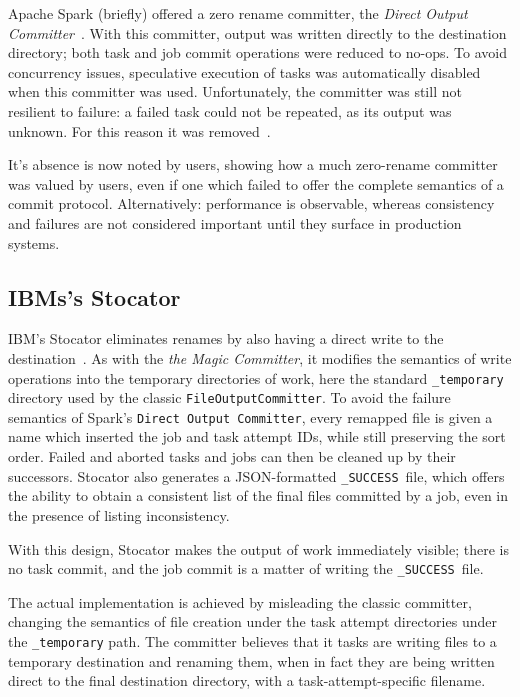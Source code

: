 \documentclass[conference]{IEEEtran}
\newcommand{\SUCCESS}{\texttt{\_SUCCESS}\ }
\begin{document}
Apache Spark (briefly) offered a zero rename committer,
the \emph{Direct Output Committer}\ \cite{SPARK-6352}.
With this committer, output was written directly to the destination directory;
both task and job commit operations were reduced to no-ops.
To avoid concurrency issues, speculative execution of tasks was automatically
disabled when this committer was used.
Unfortunately, the committer was still not resilient to failure: a failed
task could not be repeated, as its output was unknown.
For this reason it was removed\ \cite{SPARK-10063}.

It's absence is now noted by users, showing how a much zero-rename committer
was valued by users, even if one which failed to offer the complete semantics
of a commit protocol.
Alternatively: performance is observable, whereas consistency and failures
are not considered important until they surface in production systems.

\subsection{IBMs's Stocator}
\label{subsec:stocator}


IBM's Stocator eliminates renames by also having a direct write to the
destination\ \cite{Stocator}.
As with the \emph{the Magic Committer}, it modifies the semantics of write
operations into the temporary directories of work, here the standard
\texttt{\_temporary} directory used by the classic \texttt{FileOutputCommitter}.
To avoid the failure semantics of Spark's \texttt{Direct Output Committer},
every remapped file is given a name which inserted the job and task attempt IDs,
while still preserving the sort order.
Failed and aborted tasks and jobs can then be cleaned up by their successors.
Stocator also generates a JSON-formatted \SUCCESS file, which offers
the ability to obtain a consistent list of the final files committed by a job,
even in the presence of listing inconsistency.

With this design, Stocator makes the output of work immediately visible;
there is no task commit, and the job commit is a matter of writing
the \SUCCESS file.

The actual implementation is achieved by misleading the classic committer,
changing the semantics of file creation under the task attempt directories
under the \texttt{\_temporary} path.
The committer believes that it tasks are writing files to a temporary destination
and renaming them, when in fact they are being written direct to the final destination directory,
with a task-attempt-specific filename.
\end{document}
